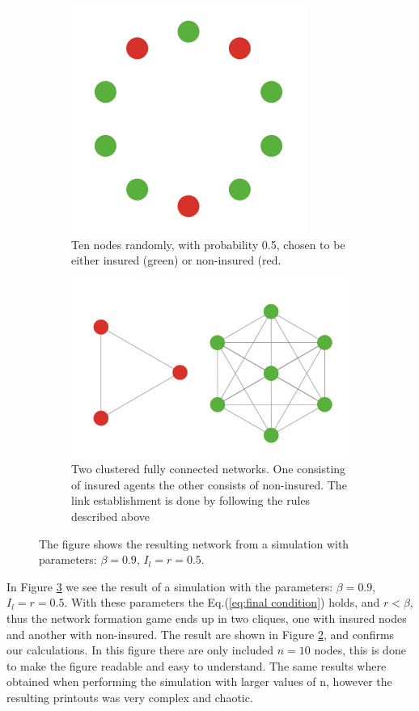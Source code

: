 \begin{figure}[h]
\centering
\begin{subfigure}{.5\textwidth}
  \centering
  \includegraphics[width=0.4\linewidth]{../Figures/FirstSimulationStart.png}
  \caption{\label{fig:firstsimulation:a} Ten nodes randomly, with probability 0.5, chosen to be either insured (green) or non-insured (red.}
\end{subfigure}
\quad
\begin{subfigure}{.46\textwidth}
  \centering
  \includegraphics[width=0.8\linewidth]{../Figures/FirstSimulationResult.png}
  \caption{\label{fig:firstsimulation:b} Two clustered fully connected networks. One consisting of insured agents the other consists of non-insured. The link establishment is done by following the rules described above}
\end{subfigure}
\caption{\label{fig:firstsimulation} The figure shows the resulting network from a simulation with parameters: $\beta=0.9$, $I_{l}=r=0.5$.}
\end{figure}
In Figure \ref{fig:firstsimulation} we see the result of a simulation with the parameters: $\beta=0.9$, $I_{l}=r=0.5$. With these parameters the Eq.(\ref{eq:final condition}) holds, and $r<\beta$, thus the network formation game ends up in two cliques, one with insured nodes and another with non-insured. The result are shown in Figure \ref{fig:firstsimulation:b}, and confirms our calculations.
In this figure there are only included $n=10$ nodes, this is done to make the figure readable and easy to understand.
The same results where obtained when performing the simulation with larger values of n, however the resulting printouts was very complex and chaotic.

